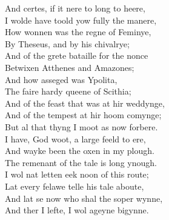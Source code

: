 \documentclass{article}
\begin{document}
\begin{multicols}{2}
\noindent\textpilcrow{}\thinspace{}And certes, if it nere to long to heere,\\
I wolde have toold yow fully the manere,\\
How wonnen was the regne of Feminye,\\
By Theseus, and by his chivalrye;\\
And of the grete bataille for the nonce\\
Betwixen Atthenes and Amazones;\\
And how asseged was Ypolita,\\
The faire hardy queene of Scithia;\\
And of the feast that was at hir weddynge,\\
And of the tempest at hir hoom comynge;\\
But al that thyng I moot as now forbere.\\
I have, God woot, a large feeld to ere,\\
And wayke been the oxen in my plough.\\
The remenant of the tale is long ynough.\\
I wol nat letten eek noon of this route;\\
Lat every felawe telle his tale aboute,\\
And lat se now who shal the soper wynne,\\
And ther I lefte, I wol ageyne bigynne.
\end{multicols}%
\end{document}

